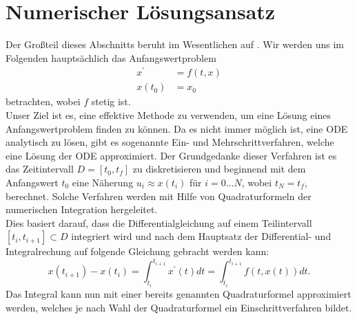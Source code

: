 \section{Numerischer Lösungsansatz}
Der Großteil dieses Abschnitts beruht im Wesentlichen auf \cite[63-79]{stykelSkriptZurVorlesung2020}. Wir werden uns im
Folgenden hauptsächlich das Anfangswertproblem
\begin{align}
    \label{first-order-num}
    x^{\prime} &= f(t,x) \nonumber \\
    x(t_0) &= x_0
\end{align}
betrachten, wobei $f$ stetig ist.\\
Unser Ziel ist es, eine effektive Methode zu verwenden, um eine Lösung eines Anfangswertproblem finden zu können.
Da es nicht immer möglich ist, eine ODE analytisch zu lösen, gibt es sogenannte Ein- und Mehrschrittverfahren, welche
eine Lösung der ODE approximiert.
Der Grundgedanke dieser Verfahren ist es das Zeitintervall $D=[t_0,t_f]$ zu diskretisieren und beginnend mit dem
Anfangswert $t_0$ eine Näherung $u_i \approx x(t_i)$ für $i=0 \dots N$, wobei $t_N=t_f$, berechnet.
Solche Verfahren werden mit Hilfe von Quadraturformeln der numerischen
Integration \cite[Numerische Integration]{walzLexikonMathematik} hergeleitet.\\
Dies basiert darauf, dass die Differentialgleichung auf einem Teilintervall $[t_i, t_{i+1}] \subset D$
integriert wird und nach dem Hauptsatz der Differential- und Integralrechung auf folgende Gleichung gebracht werden kann:
\[
    x(t_{i+1}) - x(t_i) = \int_{t_i}^{t_{i+1}} x^{\prime}(t)dt = \int_{t_i}^{t_{i+1}}f(t, x(t))dt.
\]
Das Integral kann nun mit einer bereits genannten Quadraturformel approximiert werden, welches je nach Wahl der
Quadraturformel ein Einschrittverfahren bildet.
